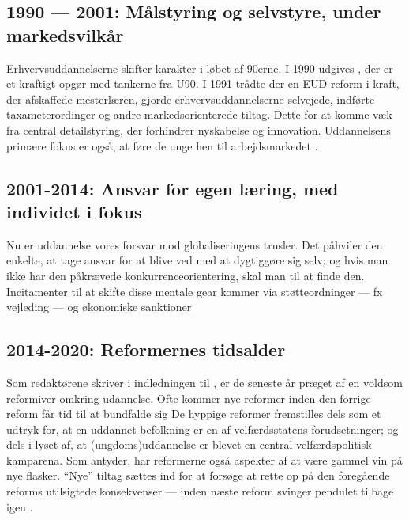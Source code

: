 {\subsection*{1990 — 2001: Målstyring og selvstyre, under markedsvilkår}

Erhvervsuddannelserne skifter karakter i løbet af 90erne.
I 1990 udgives , der er et kraftigt opgør med tankerne fra U90.
I 1991 trådte der en EUD-reform i kraft, der afskaffede mesterlæren, gjorde erhvervsuddannelserne selvejede, indførte taxameterordinger og andre markedsorienterede tiltag.
Dette for at komme væk fra central detailstyring, der forhindrer nyskabelse og innovation.
Uddannelsens primære fokus er også, at føre de unge hen til arbejdsmarkedet \autocite[s. 19]{juulDiskurserOmUngdom2013}.

\subsection*{2001-2014: Ansvar for egen læring, med individet i fokus}

Nu er uddannelse vores forsvar mod globaliseringens trusler.
Det påhviler den enkelte, at tage ansvar for at blive ved med at dygtiggøre sig selv; og hvis man ikke har den påkrævede konkurrenceorientering, skal man til at finde den.
Incitamenter til at skifte disse mentale gear kommer via støtteordninger — fx vejleding — og økonomiske sanktioner

\subsection*{2014-2020: Reformernes tidsalder}

Som redaktørene skriver i indledningen til , er de seneste år præget af en voldsom reformiver omkring udannelse.
Ofte kommer nye reformer inden den forrige reform får tid til at bundfalde sig
De hyppige reformer fremstilles dels som et udtryk for, at en uddannet befolkning er en af velfærdsstatens forudsetninger; og dels i lyset af, at (ungdoms)uddannelse er blevet en central velfærdspolitisk kamparena.
Som \citeauthor{jorgensenReformenAfErhvervsuddannelserne2016} antyder, har reformerne også aspekter af at være gammel vin på nye flasker.
“Nye” tiltag sættes ind for at forsøge at rette op på den foregående reforms utilsigtede konsekvenser — inden næste reform svinger pendulet tilbage igen \autocite[s.9 ]{jorgensenReformenAfErhvervsuddannelserne2016}.

}

